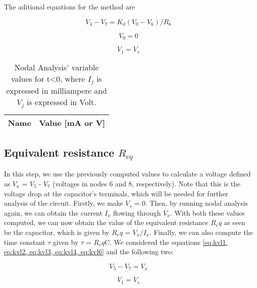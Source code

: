 The aditional equations for the method are

\begin{equation}
  V_4 - V_7 = K_d(V_0 - V_6)/R_6
  \label{eq:kvl6}
\end{equation}

\begin{equation}
  V_0 = 0
  \label{eq:kvl7}
\end{equation}

\begin{equation}
  V_1 = V_s
  \label{eq:kvl8}
\end{equation}
\begin{table}[h]
  \centering
  \begin{tabular}{|l|r|}
    \hline    
    {\bf Name} & {\bf Value [mA or V]} \\ \hline
    
  \end{tabular}
  \caption{Nodal Analysis' variable values for t<0, where $I_j$ is expressed in milliampere and $V_j$ is expressed in Volt.}
  \label{tab:Nodal}
\end{table}
\FloatBarrier

\subsection{Equivalent resistance $R_{eq}$}

In this step, we use the previously computed values to calculate a voltage defined as $V_x$ = $V_5$ - $V_7$ (voltages in nodes 6 and 8, respectively). Note that this is the voltage drop at the capacitor's terminals, which will be needed for further analysis of the circuit. Firstly, we make $V_s$ = 0. Then, by running nodal analysis again, we can obtain the current $I_x$ flowing through $V_x$. With both these values computed, we can now obtain the value of the equivalent resistance $R_eq$ as seen be the capacitor, which is given by $R_eq$ = $V_x$/$I_x$. Finally, we can also compute the time constant $\tau$ given by $\tau$ = $R_eq$C. 
We considered the equations \ref{eq:kvl1, eq:kvl2, eq:kvl3, eq:kvl4, eq:kvl6} and the following two:

\begin{equation}
  V_5 - V_7 = V_x
  \label{eq:kvl9}
\end{equation}

\begin{equation}
 V_1 = V_s 
  \label{eq:kvl10}
\end{equation}

